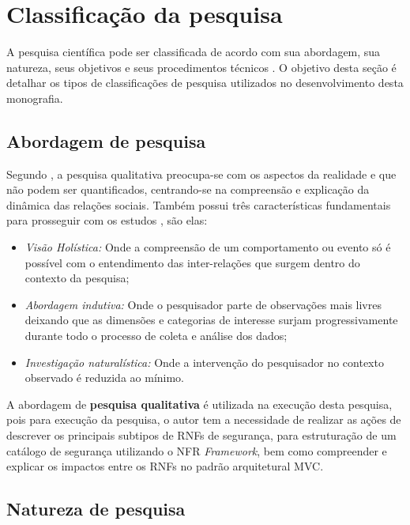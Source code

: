 \section{Classificação da pesquisa}
\label{sec:classificacaoDaPesquisa}

A pesquisa científica pode ser classificada de acordo com sua abordagem, sua natureza, seus objetivos e seus procedimentos técnicos \cite{gerhardt2009metodos}. O objetivo desta seção é detalhar os tipos de classificações de pesquisa utilizados no desenvolvimento desta monografia. 

\subsection{Abordagem de pesquisa}

Segundo \cite{gerhardt2009metodos}, a pesquisa qualitativa preocupa-se com os aspectos da realidade e que não podem ser quantificados, centrando-se na compreensão e explicação da dinâmica das relações sociais. Também possui três características fundamentais para prosseguir com os estudos \cite{mazzotti1991planejamento}, são elas:

\begin{itemize}
	\item \textit{Visão Holística:} Onde a compreensão de um comportamento ou evento só é possível com o entendimento das inter-relações que surgem dentro do contexto da pesquisa;
	\item \textit{Abordagem indutiva:} Onde o pesquisador parte de observações mais livres deixando que as dimensões e categorias de interesse surjam progressivamente durante todo o processo de coleta e análise dos dados;
	\item \textit{Investigação naturalística:} Onde a intervenção do pesquisador no contexto observado é reduzida ao mínimo.
\end{itemize}

A abordagem de \textbf{pesquisa qualitativa} é utilizada na execução desta pesquisa, pois para execução da pesquisa, o autor tem a necessidade de realizar as ações de descrever os principais subtipos de RNFs de segurança, para estruturação de um catálogo de segurança utilizando o NFR \textit{Framework}, bem como compreender e explicar os impactos entre os RNFs no padrão arquitetural MVC. 

\subsection{Natureza de pesquisa}

